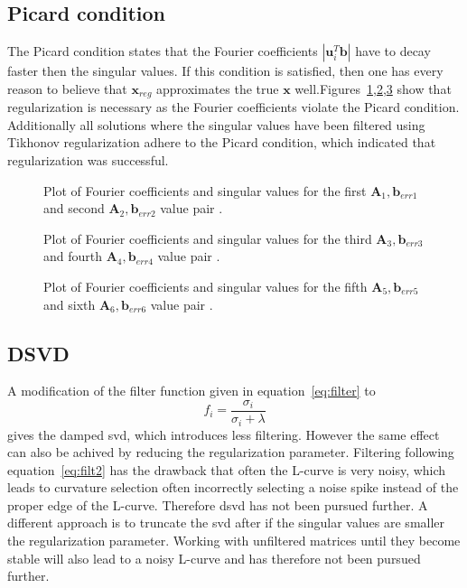\subsection{Picard condition}
The Picard condition states that the Fourier coefficients $| \mathbf{u}_i^T \mathbf{b}|$ have to decay faster then the singular values. If this condition is satisfied, then one has every reason to believe that $\mathbf{x}_{reg}$ approximates the true $\mathbf{x}$ well.Figures~\ref{fig:picard12},\ref{fig:picard34},\ref{fig:picard56} show that regularization is necessary as the Fourier coefficients violate the Picard condition.  Additionally all solutions where the singular values have been filtered using Tikhonov regularization adhere to the Picard condition, which indicated that regularization was successful.

\begin{figure}


\caption{Plot of Fourier coefficients and singular values for the first $\mathbf{A}_1, \mathbf{b}_{err1}$ and second $\mathbf{A}_2, \mathbf{b}_{err2}$ value pair .}
\label{fig:picard12}
\end{figure}
\begin{figure}


\caption{Plot of Fourier coefficients and singular values for the third $\mathbf{A}_3,\mathbf{b}_{err3}$ and fourth $\mathbf{A}_4, \mathbf{b}_{err4}$ value pair .}
\label{fig:picard34}
\end{figure}
\begin{figure}


\caption{Plot of Fourier coefficients and singular values for the fifth $\mathbf{A}_5, \mathbf{b}_{err5}$ and sixth $\mathbf{A}_6, \mathbf{b}_{err6}$ value pair .}
\label{fig:picard56}
\end{figure}


\subsection{DSVD}
A modification of the filter function given in equation~\ref{eq:filter} to
\begin{equation}
f_i = \frac{\sigma_i}{\sigma_i + \lambda}
\label{eq:filt2}
\end{equation}
gives the damped svd, which introduces less filtering. However the same effect can also be achived by reducing the regularization parameter. Filtering following equation~\ref{eq:filt2} has the drawback that often the L-curve is very noisy, which leads to curvature selection often incorrectly selecting a noise spike instead of the proper edge of the L-curve.
Therefore dsvd has not been pursued further.
A different approach is to truncate the svd after if the singular values are smaller the regularization parameter. Working with unfiltered matrices until they become stable will also lead to a noisy L-curve and has therefore not been pursued further.
  
